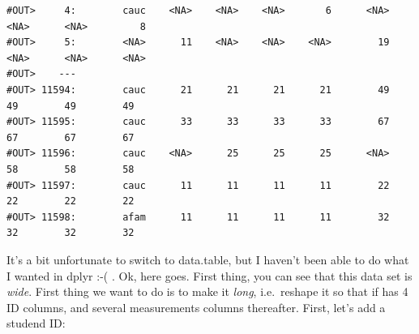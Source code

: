 \documentclass[]{book}
\begin{document}
\begin{verbatim}
#OUT>     4:        cauc    <NA>    <NA>    <NA>       6      <NA>      <NA>      <NA>         8
#OUT>     5:        <NA>      11    <NA>    <NA>    <NA>        19      <NA>      <NA>      <NA>
#OUT>    ---                                                                                    
#OUT> 11594:        cauc      21      21      21      21        49        49        49        49
#OUT> 11595:        cauc      33      33      33      33        67        67        67        67
#OUT> 11596:        cauc    <NA>      25      25      25      <NA>        58        58        58
#OUT> 11597:        cauc      11      11      11      11        22        22        22        22
#OUT> 11598:        afam      11      11      11      11        32        32        32        32
\end{verbatim}

It's a bit unfortunate to switch to data.table, but I haven't been able to do what I wanted in dplyr :-( . Ok, here goes. First thing, you can see that this data set is \emph{wide}. First thing we want to do is to make it \emph{long}, i.e.~reshape it so that if has 4 ID columns, and several measurements columns thereafter. First, let's add a studend ID:
\end{document}
